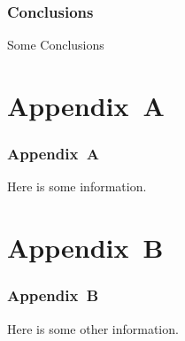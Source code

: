 \documentclass{beamer}
\begin{document}
    \begin{frame}
    \frametitle{Conclusions}
    Some Conclusions\\
    \end{frame}
		
    \section{Appendix~A}

    \begin{frame}[label=apa]
    \frametitle{Appendix~A}
    Here is some information.\\
    \hyperlink{mr<1>}{}

    \end{frame}


    \section{Appendix~B}

    \begin{frame}[label=apb]
    \frametitle{Appendix~B}
    Here is some other information.\\
    \hyperlink{mr<1>}{}
    \end{frame}

    
\end{document}
